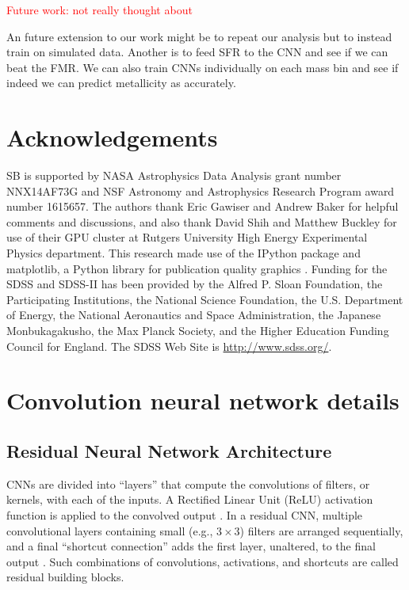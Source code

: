 \documentclass[fleqn,usenatbib]{mnras}
\newcommand{\editorial}[1]{\textcolor{red}{#1}}
\begin{document}
\editorial{Future work:}
\editorial{not really thought about}

An future extension to our work might be to repeat our analysis but to instead train on simulated data.
Another is to feed SFR to the CNN and see if we can beat the FMR.
We can also train CNNs individually on each mass bin and see if indeed we can predict metallicity as accurately.


\section*{Acknowledgements}

SB is supported by NASA Astrophysics Data Analysis grant number NNX14AF73G and NSF Astronomy and Astrophysics Research Program award number 1615657.
The authors thank Eric Gawiser and Andrew Baker for helpful comments and discussions, and also thank David Shih and Matthew Buckley for use of their GPU cluster at Rutgers University High Energy Experimental Physics department. %
This research made use of the {\sc IPython} package \citep{Perez2007} and {\sc matplotlib}, a Python library for publication quality graphics \citep{Hunter2007}. Funding for the SDSS and SDSS-II has been provided by the Alfred P. Sloan Foundation, the Participating Institutions, the National Science Foundation, the U.S. Department of Energy, the National Aeronautics and Space Administration, the Japanese Monbukagakusho, the Max Planck Society, and the Higher Education Funding Council for England. The SDSS Web Site is \url{http://www.sdss.org/}.




\appendix
%
\section{Convolution neural network details}

\subsection{Residual Neural Network Architecture}
CNNs are divided into ``layers'' that compute the convolutions of filters, or kernels, with each of the inputs.
A Rectified Linear Unit (ReLU) activation function is applied to the convolved output \citep[ReLUs have been shown to propagate information about the relative importances of different features, and are effective for training deep neural networks;][]{Nair2010}.
In a residual CNN, multiple convolutional layers containing small (e.g., $3\times 3$) filters are arranged sequentially, and a final ``shortcut connection'' adds the first layer, unaltered, to the final output \citep[before the final ReLU activation; see, e.g., Figure~2 of][]{He2015}.
Such combinations of convolutions, activations, and shortcuts are called residual building blocks.
\end{document}

